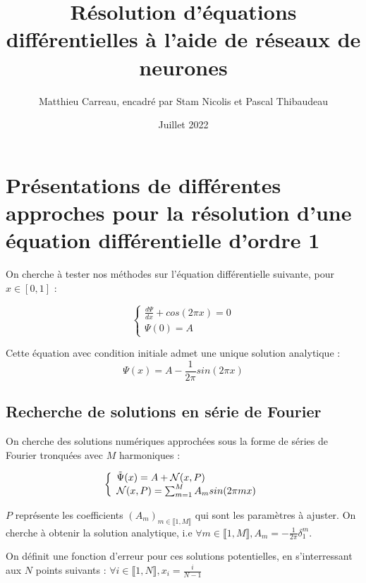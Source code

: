 \documentclass{article}
\title{Résolution d'équations différentielles à l'aide de réseaux de neurones}
\author{Matthieu Carreau, encadré par Stam Nicolis et Pascal Thibaudeau}
\date{Juillet 2022}
\begin{document}
\maketitle


\section{Présentations de différentes approches pour la résolution d'une équation différentielle d'ordre 1}
On cherche à tester nos méthodes sur l'équation différentielle suivante, pour $x\in [0,1]$ :

\begin{equation}
\left\{
    \begin{array}{ll}
        \frac{d\Psi}{dx} + cos(2\pi x) = 0 \\
        \Psi(0) = A
    
    \end{array}
\right.
\label{eq:equa dif}
\end{equation}

Cette équation avec condition initiale admet une unique solution analytique :
\begin{equation}
    {\Psi}(x) = A - \frac{1}{2\pi}sin(2\pi x)
\label{eq:solution analytique}
\end{equation}

\subsection{Recherche de solutions en série de Fourier}

On cherche des solutions numériques approchées sous la forme de séries de Fourier tronquées avec $M$ harmoniques :

\begin{equation}
\left\{
    \begin{array}{ll}
        \Tilde{\Psi}(x) = A + {\mathcal{N}}(x,P) \\
        {\mathcal{N}}(x,P) = \sum_{m=1}^{M} A_m sin(2\pi m x) 
    \end{array}
\right.
\label{eq:solution Fourier}
\end{equation}

$P$ représente les coefficients $(A_m)_{m\in \llbracket 1,M \rrbracket}$ qui sont les paramètres à ajuster.
On cherche à obtenir la solution analytique, i.e $\forall m \in\llbracket 1,M \rrbracket, A_m = -\frac{1}{2\pi}\delta _1 ^m $.

On définit une fonction d'erreur pour ces solutions potentielles, en s'interressant aux $N$ points suivants : $\forall i \in\llbracket 1,N \rrbracket, x_i = \frac{i}{N-1} $
\end{document}
